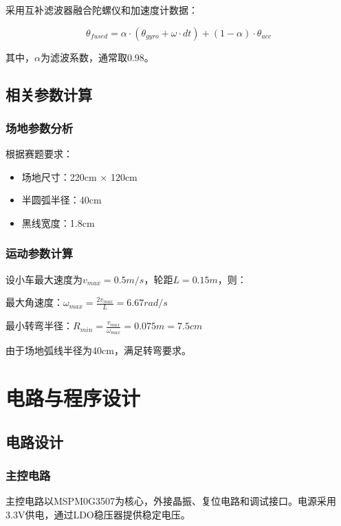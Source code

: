 \documentclass[UTF8]{ctexart}
\begin{document}
采用互补滤波器融合陀螺仪和加速度计数据：

\begin{equation} \label{eq:complementary_filter}
    \theta_{fused} = \alpha \cdot (\theta_{gyro} + \omega \cdot dt) + (1-\alpha) \cdot \theta_{acc}
\end{equation}

其中，$\alpha$为滤波系数，通常取0.98。

\subsection{相关参数计算}

\subsubsection{场地参数分析}

根据赛题要求：
\begin{itemize}
    \item 场地尺寸：220cm × 120cm
    \item 半圆弧半径：40cm
    \item 黑线宽度：1.8cm
\end{itemize}

\subsubsection{运动参数计算}

设小车最大速度为$v_{max} = 0.5m/s$，轮距$L = 0.15m$，则：

最大角速度：$\omega_{max} = \frac{2v_{max}}{L} = 6.67 rad/s$

最小转弯半径：$R_{min} = \frac{v_{max}}{\omega_{max}} = 0.075m = 7.5cm$

由于场地弧线半径为40cm，满足转弯要求。

\section{电路与程序设计}

\subsection{电路设计}

\subsubsection{主控电路}

主控电路以MSPM0G3507为核心，外接晶振、复位电路和调试接口。电源采用3.3V供电，通过LDO稳压器提供稳定电压。
\end{document}
